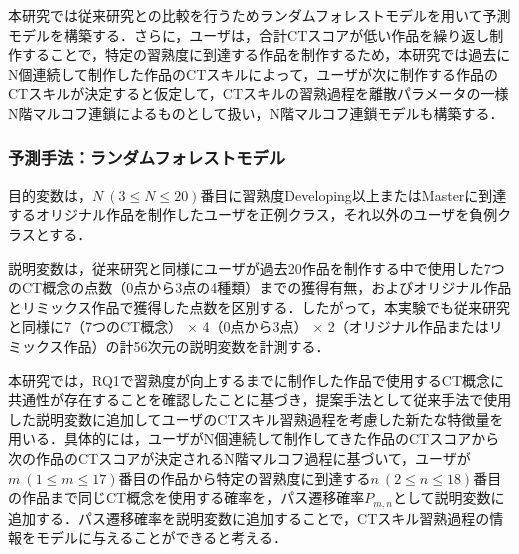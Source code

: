 \documentclass[submit,ses,noauthor]{ipsj}
\newcommand{\todo}[1]{\colorbox{yellow}{{\bf TODO}:}{\color{red} {\textbf{[#1]}}}}
\begin{document}





本研究では従来研究との比較を行うためランダムフォレストモデルを用いて予測モデルを構築する．さらに，ユーザは，合計CTスコアが低い作品を繰り返し制作することで，特定の習熟度に到達する作品を制作するため，本研究では過去にN個連続して制作した作品のCTスキルによって，ユーザが次に制作する作品のCTスキルが決定すると仮定して，CTスキルの習熟過程を離散パラメータの一様N階マルコフ連鎖によるものとして扱い，N階マルコフ連鎖モデルも構築する．


\subsubsection{予測手法：ランダムフォレストモデル}

目的変数は，{$N~(3 \leq N \leq 20)$}番目に習熟度Developing以上またはMasterに到達するオリジナル作品を制作したユーザを正例クラス，それ以外のユーザを負例クラスとする．

説明変数は，従来研究と同様にユーザが過去20作品を制作する中で使用した7つのCT概念の点数（0点から3点の4種類）までの獲得有無，およびオリジナル作品とリミックス作品で獲得した点数を区別する\cite{Dasgupta_2016}．したがって，本実験でも従来研究と同様に7（7つのCT概念） $\times$ 4（0点から3点） $\times$ 2（オリジナル作品またはリミックス作品）の計56次元の説明変数を計測する．

本研究では，RQ1で習熟度が向上するまでに制作した作品で使用するCT概念に共通性が存在することを確認したことに基づき，提案手法として従来手法で使用した説明変数に追加してユーザのCTスキル習熟過程を考慮した新たな特徴量を用いる．具体的には，ユーザがN個連続して制作してきた作品のCTスコアから次の作品のCTスコアが決定されるN階マルコフ過程に基づいて，ユーザが$m~(1 \leq m \leq 17)$番目の作品から特定の習熟度に到達する$n~(2 \leq n \leq 18)$番目の作品まで同じCT概念を使用する確率を，パス遷移確率$P_{m,n}$として説明変数に追加する．パス遷移確率を説明変数に追加することで，CTスキル習熟過程の情報をモデルに与えることができると考える．
\end{document}
